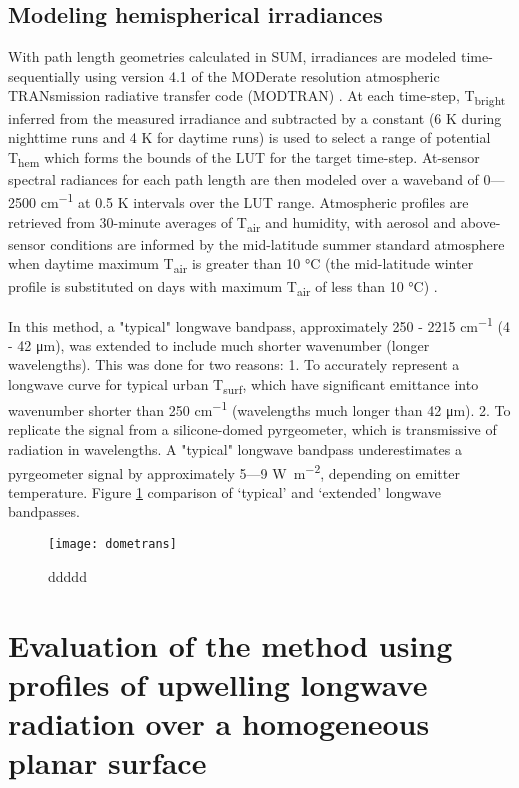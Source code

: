 \subsection{Modeling hemispherical irradiances}
With path length geometries calculated in SUM, irradiances are modeled time-sequentially using version 4.1 of the MODerate resolution atmospheric TRANsmission radiative transfer code (MODTRAN) \cite{Berk1987}. At each time-step, T\textsubscript{bright} inferred from the measured irradiance and subtracted by a constant (6 \si{K} during nighttime runs and 4 \si{K} for daytime runs) is used to select a range of potential T\textsubscript{hem} which forms the bounds of the LUT for the target time-step. At-sensor spectral radiances for each path length are then modeled over a waveband of 0---2500 \si{cm^{-1}} at 0.5 \si{K} intervals over the LUT range. Atmospheric profiles are retrieved from 30-minute averages of T\textsubscript{air} and humidity, with aerosol and above-sensor conditions are informed by the mid-latitude summer standard atmosphere when daytime maximum T\textsubscript{air} is greater than 10 \si{\degreeCelsius} (the mid-latitude winter profile is substituted on days with maximum T\textsubscript{air} of less than 10 \si{\degreeCelsius}) \cite{Kantor1962}. 

In this method, a "typical" longwave bandpass, approximately 250 - 2215 \si{cm^{-1}} (4 - 42 \si{\micro\meter}), was extended to include much shorter wavenumber (longer wavelengths). This was done for two reasons: 1. To accurately represent a longwave curve for typical urban T\textsubscript{surf}, which have significant emittance into wavenumber shorter than 250 \si{cm^{-1}} (wavelengths much longer than 42 \si{\micro\meter}). 2. To replicate the signal from a silicone-domed pyrgeometer, which is transmissive of radiation in wavelengths. A "typical" longwave bandpass underestimates a pyrgeometer signal by approximately 5---9 \si{\watt\per\square\meter}, depending on emitter temperature. Figure \ref{dometrans} comparison of ‘typical’ and ‘extended’ longwave bandpasses.

\begin{figure}[!ht]
	\texttt{[image: dometrans]}
	\label{dometrans}
	\caption{ddddd}
\end{figure}




\section{Evaluation of the method using profiles of upwelling longwave radiation over a homogeneous planar surface}

